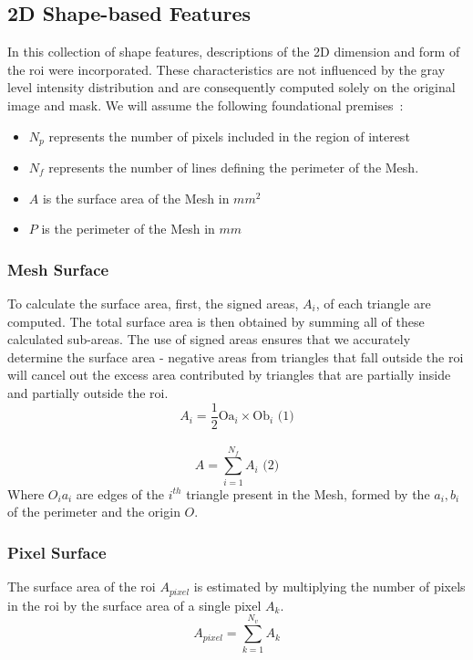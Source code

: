 \subsection{2D Shape-based Features}
In this collection of shape features, descriptions of the 2D dimension and form of the \ac{roi} were incorporated. These characteristics are not influenced by the gray level intensity distribution and are consequently computed solely on the original image and mask.
We will assume the following foundational premises~\cite{van_griethuysen_computational_2017}:
\begin{itemize}
    \item $N_p$ represents the number of pixels included in the region of interest
    \item $N_f$ represents the number of lines defining the perimeter of the Mesh.
    \item $A$ is the surface area of the Mesh in $mm^2$
    \item $P$ is the perimeter of the Mesh in $mm$
\end{itemize}

\subsubsection*{Mesh Surface}
To calculate the surface area, first, the signed areas, \(A_i\), of each triangle are computed. The total surface area is then obtained by summing all of these calculated sub-areas. The use of signed areas ensures that we accurately determine the surface area - negative areas from triangles that fall outside the \ac{roi} will cancel out the excess area contributed by triangles that are partially inside and partially outside the \ac{roi}.
\begin{equation}
    A_i = \frac{1}{2}\text{Oa}_i \times \text{Ob}_i \text{ (1)}
\end{equation} \\
\begin{equation}
    A = \displaystyle\sum^{N_f}_{i=1}{A_i} \text{ (2)}
\end{equation}
Where $O_ia_i$ are edges of the $i^{th}$ triangle present in the Mesh, formed by the $a_i,b_i$ of the perimeter and the origin $O$.

\subsubsection*{Pixel Surface}
The surface area of the \ac{roi} $A_{pixel}$ is estimated by multiplying the number of pixels in the \ac{roi} by the surface area of a single pixel $A_k$.
\begin{equation}
    A_{pixel} = \displaystyle\sum^{N_v}_{k=1}{A_k}    
\end{equation}


